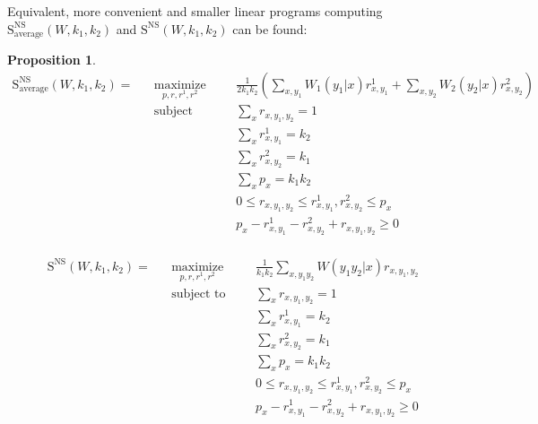 \documentclass[11pt]{article}
\theoremstyle{definition}
\newtheorem{prop}[theo]{Proposition}
\theoremstyle{remark}
\DeclareMathOperator{\maxi}{\text{maximize}}
\DeclareMathOperator{\st}{\text{subject to}}
\begin{document}
Equivalent, more convenient and smaller linear programs computing $\mathrm{S}_{\text{average}}^{\mathrm{NS}}(W,k_1,k_2)$ and $\mathrm{S}^{\mathrm{NS}}(W,k_1,k_2)$ can be found:

\begin{prop}
\begin{equation}
  \begin{aligned}
    \mathrm{S}_{\text{average}}^{\mathrm{NS}}(W,k_1,k_2) = &&\underset{p,r,r^1,r^2}{\maxi} &&& \frac{1}{2k_1k_2}\left(\sum_{x,y_1} W_1(y_1|x)r^1_{x,y_1} + \sum_{x,y_2} W_2(y_2|x)r^2_{x,y_2}\right)\\
    &&\st &&& \sum_{x} r_{x,y_1,y_2} = 1\\
    &&&&&\sum_{x} r^1_{x,y_1} = k_2\\
    &&&&& \sum_{x} r^2_{x,y_2} = k_1\\
    &&&&& \sum_{x} p_x = k_1k_2\\
    &&&&& 0 \leq r_{x,y_1,y_2} \leq r^1_{x,y_1}, r^2_{x,y_2} \leq p_x\\
    &&&&& p_x - r^1_{x,y_1} - r^2_{x,y_2} + r_{x,y_1,y_2} \geq 0\\
  \end{aligned}
\end{equation}

\begin{equation}
  \begin{aligned}
    \mathrm{S}^{\mathrm{NS}}(W,k_1,k_2) = &&\underset{p,r,r^1,r^2}{\maxi} &&& \frac{1}{k_1k_2}\sum_{x,y_1y_2} W(y_1y_2|x)r_{x,y_1,y_2}\\
    &&\st &&& \sum_{x} r_{x,y_1,y_2} = 1\\
    &&&&&\sum_{x} r^1_{x,y_1} = k_2\\
    &&&&& \sum_{x} r^2_{x,y_2} = k_1\\
    &&&&& \sum_{x} p_x = k_1k_2\\
    &&&&& 0 \leq r_{x,y_1,y_2} \leq r^1_{x,y_1}, r^2_{x,y_2} \leq p_x\\
    &&&&& p_x - r^1_{x,y_1} - r^2_{x,y_2} + r_{x,y_1,y_2} \geq 0\\
  \end{aligned}
\end{equation}
\end{prop}
\end{document}

